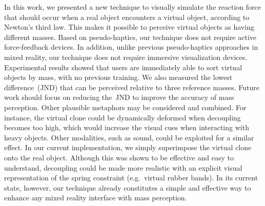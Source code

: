\documentclass{vgtc}
\begin{document}
In this work, we presented a new technique to visually simulate the reaction force that should occur when a real object encounters a virtual object, according to Newton's third law. This makes it possible to perceive virtual objects as having different masses. Based on pseudo-haptics, our technique does not require active force-feedback devices. In addition, unlike previous pseudo-haptics approaches in mixed reality, our technique does not require immersive visualization devices. Experimental results showed that users are immediately able to sort virtual objects by mass, with no previous training. We also measured the lowest difference~(JND) that can be perceived relative to three reference masses. Future work should focus on reducing the~JND to improve the accuracy of mass perception. Other plausible metaphors may be considered and combined. For instance, the virtual clone could be dynamically deformed when decoupling becomes too high, which would increase the visual cues when interacting with heavy objects. Other modalities, such as sound, could be exploited for a similar effect. In our current implementation, we simply superimpose the virtual clone onto the real object. Although this was shown to be effective and easy to understand, decoupling could be made more realistic with an explicit visual representation of the spring constraint (e.g.~virtual rubber bands). In its current state, however, our technique already constitutes a simple and effective way to enhance any mixed reality interface with mass perception.


\vspace{2mm}



\end{document}
